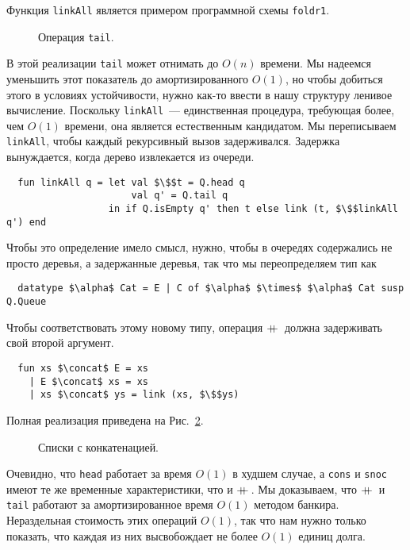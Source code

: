 \begin{remark}
  Функция \lstinline!linkAll! является примером программной схемы \lstinline!foldr1!.
\end{remark}

\begin{figure}
  \centering
  
  \caption{Операция \lstinline!tail!.}
  \label{fig:10.5}
\end{figure}
В этой реализации \lstinline!tail! может отнимать до $O(n)$
времени. Мы надеемся уменьшить этот показатель до амортизированного
$O(1)$, но чтобы добиться этого в условиях устойчивости,
нужно как-то ввести в нашу структуру ленивое вычисление. Поскольку
\lstinline!linkAll!~--- единственная процедура, требующая более, чем
$O(1)$ времени, она является естественным кандидатом. Мы переписываем
\lstinline!linkAll!, чтобы каждый рекурсивный вызов
задерживался. Задержка вынуждается, когда дерево извлекается из
очереди.
\begin{lstlisting}
  fun linkAll q = let val $\$$t = Q.head q
                      val q' = Q.tail q
                  in if Q.isEmpty q' then t else link (t, $\$$linkAll q') end
\end{lstlisting}
Чтобы это определение имело смысл, нужно, чтобы в очередях содержались
не просто деревья, а задержанные деревья, так что мы переопределяем
тип как
\begin{lstlisting}
  datatype $\alpha$ Cat = E | C of $\alpha$ $\times$ $\alpha$ Cat susp Q.Queue
\end{lstlisting}
Чтобы соответствовать этому новому типу, операция $+\!\!\!+\,$ должна
задерживать свой второй аргумент.
\begin{lstlisting}
  fun xs $\concat$ E = xs
    | E $\concat$ xs = xs
    | xs $\concat$ ys = link (xs, $\$$ys)
\end{lstlisting}
Полная реализация приведена на Рис.~\ref{fig:10.6}.

\begin{figure}
  \centering

  \caption{Списки с конкатенацией.}
  \label{fig:10.6}
\end{figure}

Очевидно, что \lstinline!head! работает за время $O(1)$ в худшем
случае, а \lstinline!cons! и \lstinline!snoc! имеют те же временные
характеристики, что и $+\!\!\!+\,$. Мы доказываем, что $+\!\!\!+\,$ и
\lstinline!tail! работают за амортизированное время $O(1)$ методом
банкира. Нераздельная стоимость этих операций $O(1)$, так
что нам нужно только показать, что каждая из них высвобождает не более
$O(1)$ единиц долга.

